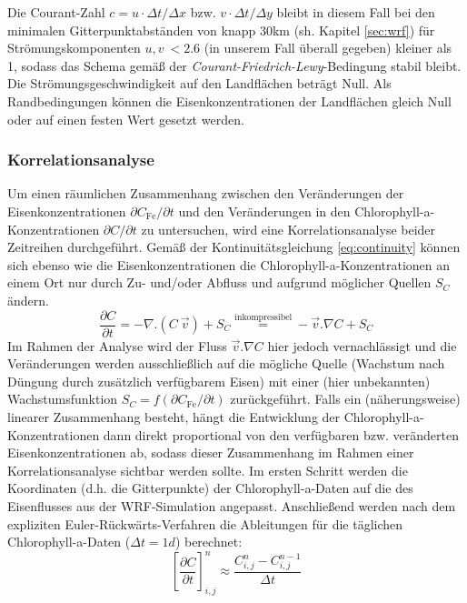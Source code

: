 \documentclass[12pt,a4paper,onecolumn,draft]{scrartcl}
\begin{document}
Die Courant-Zahl $c = u \cdot \Delta t / \Delta x$ bzw. $v \cdot \Delta t / \Delta y$ bleibt in diesem Fall bei den minimalen Gitterpunktabständen von knapp 30km (sh. Kapitel \ref{sec:wrf}) für Strömungskomponenten $u,v \ < 2.6$ (in unserem Fall überall gegeben) kleiner als 1, sodass das Schema gemäß der \textit{Courant-Friedrich-Lewy}-Bedingung stabil bleibt. Die Strömungsgeschwindigkeit auf den Landflächen beträgt Null. Als Randbedingungen können die Eisenkonzentrationen der Landflächen gleich Null oder auf einen festen Wert gesetzt werden. 
\subsubsection{Korrelationsanalyse} \label{sec:methods_correlation}
Um einen räumlichen Zusammenhang zwischen den Veränderungen der Eisenkonzentrationen $\partial C_\text{Fe} / \partial t$ und den Veränderungen in den Chlorophyll-a-Konzentrationen $\partial C / \partial t$ zu untersuchen, wird eine Korrelationsanalyse beider Zeitreihen durchgeführt. Gemäß der Kontinuitätsgleichung \ref{eq:continuity} können sich ebenso wie die Eisenkonzentrationen die Chlorophyll-a-Konzentrationen an einem Ort nur durch Zu- und/oder Abfluss und aufgrund möglicher Quellen $S_C$ ändern.
\begin{equation}
\frac{\partial C}{\partial t} = - \nabla . (C \ \vec{v}) + S_C  \overset{\text{inkompressibel}}{=} - \vec{v}.\nabla C + S_C \label{eq:continuity}
\end{equation}
Im Rahmen der Analyse wird der Fluss $\vec{v}.\nabla C$ hier jedoch vernachlässigt und die Veränderungen werden ausschließlich auf die mögliche Quelle (Wachstum nach Düngung durch zusätzlich verfügbarem Eisen) mit einer (hier unbekannten) Wachstumsfunktion $S_C = f(\partial C_\text{Fe} / \partial t)$ zurückgeführt. Falls ein (näherungsweise) linearer Zusammenhang besteht, hängt die Entwicklung der Chlorophyll-a-Konzentrationen dann direkt proportional von den verfügbaren bzw. veränderten Eisenkonzentrationen ab, sodass dieser Zusammenhang im Rahmen einer Korrelationsanalyse sichtbar werden sollte. Im ersten Schritt werden die Koordinaten (d.h. die Gitterpunkte) der Chlorophyll-a-Daten auf die des Eisenflusses aus der WRF-Simulation angepasst. Anschließend werden nach dem expliziten Euler-Rückwärts-Verfahren die Ableitungen für die täglichen Chlorophyll-a-Daten ($\Delta t = 1d$) berechnet:
\begin{equation}
\left[\frac{\partial C}{\partial t}\right]_{i,j}^{n} \approx \frac{C_{i,j}^n-C_{i,j}^{n-1}}{\Delta t}
\end{equation}
\end{document}
